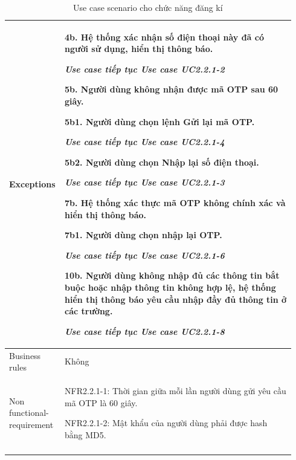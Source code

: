 \begin{longtable}{|>{\hspace{0pt}}m{0.15\linewidth}|>{\hspace{0pt}}m{0.79\linewidth}|}
Exceptions & 4b. Hệ thống xác nhận số điện thoại này đã có người sử dụng, hiển thị thông báo.\par{}\textit{Use case tiếp tục Use case UC2.2.1-2}\par{}5b. Người dùng không nhận được mã OTP sau 60 giây.\par{}5b1. Người dùng chọn lệnh Gửi lại mã OTP.\par{}\textit{Use case tiếp tục Use case UC2.2.1-4}\par{}5b2. Người dùng chọn Nhập lại số điện thoại.\par{}\textit{Use case tiếp tục Use case UC2.2.1-3}\par{}7b. Hệ thống xác thực mã OTP không chính xác và hiển thị thông báo.\par{}7b1. Người dùng chọn nhập lại OTP.\par{}\textit{Use case tiếp tục Use case UC2.2.1-6}\par{}10b. Người dùng không nhập đủ các thông tin bắt buộc hoặc nhập thông tin không hợp lệ, hệ thống hiển thị thông báo yêu cầu nhập đầy đủ thông tin ở các trường.\par{}\textit{Use case tiếp tục Use case UC2.2.1-8} \\ 
\hline
Business rules & Không \\ 
\hline
Non functional-requirement & NFR2.2.1-1: Thời gian giữa mỗi lần người dùng gửi yêu cầu mã OTP là 60 giây.\par{}NFR2.2.1-2: Mật khẩu của người dùng phải được hash bằng MD5. \\ 
\hline
\caption{Use case scenario cho chức năng đăng kí}
\end{longtable}

%
%


